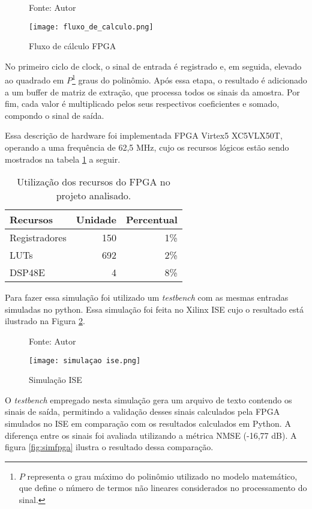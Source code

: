 \begin{figure}[htbp!]
	\centering
	\captionsetup{justification=centering}
	\caption*{Fonte: Autor}
	\texttt{[image: fluxo\_de\_calculo.png]}
	\caption{Fluxo de cálculo FPGA}
	\label{fig:fluxocal}
\end{figure}


No primeiro ciclo de clock, o sinal de entrada é registrado e, em seguida, elevado ao quadrado em \( P \)\footnote{\( P \) representa o grau máximo do polinômio utilizado no modelo matemático, que define o número de termos não lineares considerados no processamento do sinal.} graus do polinômio. Após essa etapa, o resultado é adicionado a um buffer de matriz de extração, que processa todos os sinais da amostra. Por fim, cada valor é multiplicado pelos seus respectivos coeficientes e somado, compondo o sinal de saída.  



Essa descrição de hardware foi implementada FPGA Virtex5 XC5VLX50T, operando a uma frequência de 62,5 MHz, cujo os recursos lógicos estão sendo mostrados na tabela \ref{tab:recursos_fpga} a seguir.

\begin{table}[htbp!]
	\centering
	\begin{tabular}{|l|r|r|}
		\hline
		Recursos & Unidade & Percentual \\
		\hline
		Registradores & 150 & 1\% \\
		LUTs & 692 & 2\% \\
		DSP48E & 4 & 8\% \\
		\hline
	\end{tabular}
	\caption{Utilização dos recursos do FPGA no projeto analisado.}
	\label{tab:recursos_fpga}
\end{table}

Para fazer essa simulação foi utilizado um \textit{testbench} com as mesmas entradas simuladas no python. Essa simulação foi feita no Xilinx ISE cujo o resultado está ilustrado na Figura \ref{fig:simise}.

\begin{figure}[htbp!]
	\centering
	\captionsetup{justification=centering}
	\caption*{Fonte: Autor}
	\texttt{[image: simulaçao ise.png]}
	\caption{Simulação ISE}
	\label{fig:simise}
\end{figure}

O \textit{testbench} empregado nesta simulação gera um arquivo de texto contendo os sinais de saída, permitindo a validação desses sinais calculados pela FPGA simulados no ISE em comparação com os resultados calculados em Python.  A diferença entre os sinais foi avaliada utilizando a métrica NMSE (-16,77 dB). A figura \ref{fig:simfpga} ilustra o resultado dessa comparação.


